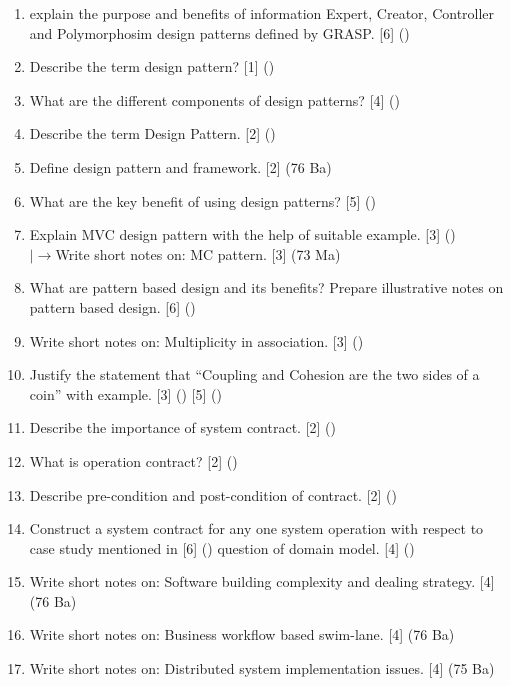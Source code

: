 \documentclass[12pt]{article}
\newcommand{\lb}{\\$\left|\rightarrow\right.$}
\begin{document}
\begin{enumerate}
    \item explain the purpose and benefits of information Expert, Creator, Controller and Polymorphosim design patterns defined by GRASP. \hfill [6] ()

    \item Describe the term design pattern? \hfill [1] ()

    \item What are the different components of design patterns? \hfill [4] ()

    \item Describe the term Design Pattern. \hfill [2] ()

    \item Define design pattern and framework. \hfill [2] (76 Ba)

    \item What are the key benefit of using design patterns? \hfill [5] ()
    
    \item Explain MVC design pattern with the help of suitable example. \hfill [3] ()
    \lb Write short notes on: MC pattern. \hfill [3] (73 Ma)

    \item What are pattern based design and its benefits? Prepare illustrative notes on pattern based design. \hfill [6] ()

    \item Write short notes on: Multiplicity in association. \hfill [3] ()

    \item Justify the statement that ``Coupling and Cohesion are the two sides of a coin'' with example. \hfill [3] () [5] ()

    \item Describe the importance of system contract. \hfill [2] ()

    \item What is operation contract? \hfill [2] ()

    \item Describe pre-condition and post-condition of contract. \hfill [2] ()

    \item Construct a system contract for any one system operation with respect to case study mentioned in [6] () question of domain model. \hfill [4] ()

    \item Write short notes on: Software building complexity and dealing strategy. \hfill [4] (76 Ba)

    \item Write short notes on: Business workflow based swim-lane. \hfill [4] (76 Ba)

    \item Write short notes on: Distributed system implementation issues. \hfill [4] (75 Ba)
  \end{enumerate}
\end{document}
